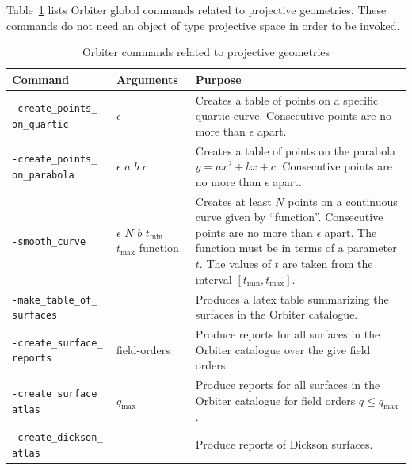 Table~\ref{tab:projective} lists Orbiter global commands 
related to projective geometries. 
These commands do not need an object of type projective space in order to be invoked.
\begin{table}
\begin{center}
\begin{tabular}{|p{5cm}|p{2cm}|p{7cm}|}
\hline
Command & Arguments & Purpose \\
\hline
\verb'-create_points_' \verb'on_quartic' &  $\epsilon$  & Creates a table of points on a specific quartic curve. Consecutive points are no more than $\epsilon$ apart. \\
\hline
\verb'-create_points_' \verb'on_parabola' &  $\epsilon$  $a$ $b$ $c$  & Creates a table of points on the parabola $y=ax^2+bx+c$. Consecutive points are no more than $\epsilon$ apart. \\
\hline
\verb'-smooth_curve' &  $\epsilon$ $N$ $b$ $t_{\min}$ $t_{\max}$ function  & Creates at least $N$ points on a continuous curve given by ``function''. Consecutive points are no more than $\epsilon$ apart.  The function must be in terms of a parameter $t$. The values of $t$ are taken from the interval $[t_{\min},t_{\max}]$. \\
\hline
\verb'-make_table_of_' \verb'surfaces' &  & Produces a latex table summarizing the surfaces in the Orbiter catalogue. \\
\hline
\verb'-create_surface_' \verb'reports' & field-orders & Produce reports for all surfaces in the Orbiter catalogue over the give field orders. \\
\hline
\verb'-create_surface_' \verb'atlas' & $q_{\max}$ & Produce reports for all surfaces in the Orbiter catalogue for field orders $q \le q_{\max}$. \\
\hline
\verb'-create_dickson_' \verb'atlas' &  & Produce reports of Dickson surfaces. \\
\hline
\end{tabular}
\end{center}
\caption{\label{tab:projective}Orbiter commands related to projective geometries}
\end{table}


